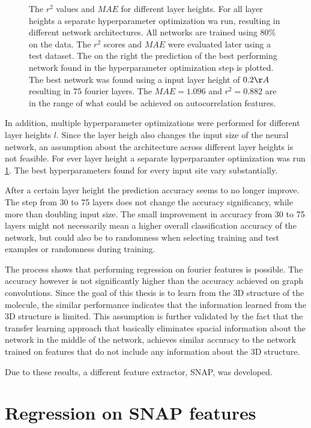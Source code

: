 \begin{figure}[!htb]
    \endminipage
    \caption{
    The $r^2$ values and $MAE$ for different layer heights.
    For all layer heights a separate hyperparameter optimization wa run, resulting in different network architectures.
    All networks are trained using 80\% on the data. The $r^2$ scores and $MAE$ were evaluated later using a test dataset.
    The on the right the prediction of the best performing network found in the hyperparameter optimization step is plotted.
    The best network was found using a input layer height of $0.2 \AA$ resulting in $75$ fourier layers. 
    The $MAE=1.096$ and $r^2=0.882$ are in the range of what could be achieved on autocorrelation features.
    }
    \label{fig:fourier_final}
\end{figure}


In addition, multiple hyperparameter optimizations were performed for different layer heights $l$.
Since the layer heigh also changes the input size of the neural network, an assumption about the 
architecture across different layer heights is not feasible.
For ever layer height a separate hyperparamter optimization was run \ref{fig:fourier_final}.
The best hyperparameters found for every input site vary substantially.

After a certain layer height the prediction accuracy seems to no longer improve.
The step from 30 to 75 layers does not change the accuracy significancy, while more than doubling input size.
The small improvement in accuracy from 30 to 75 layers might not necessarily mean a higher overall classification accuracy of the network,
but could also be to randomness when selecting training and test examples or randomness during training.

The process shows that performing regression on fourier features is possible.
The accuracy however is not significantly higher than the accuracy achieved on graph convolutions.
Since the goal of this thesis is to learn from the 3D structure of the molecule, the similar performance 
indicates that the information learned from the 3D structure is limited.
This assumption is further validated by the fact that the transfer learning approach that 
basically eliminates spacial information about the network in the middle of the network, achieves similar accuracy to the 
network trained on features that do not include any information about the 3D structure.

Due to these results, a different feature extractor, SNAP, was developed.

\section{Regression on SNAP features}
\label{sec:Evaluation:snap}

